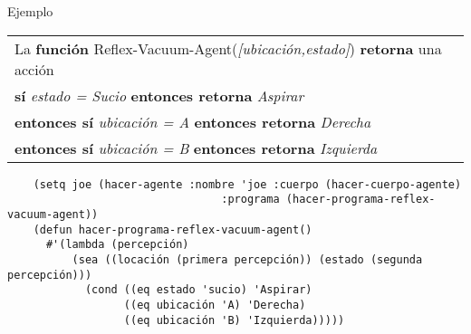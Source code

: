 \begin{frame}[fragile]{Ejemplo}
 \begin{center}
  \begin{tabular}{|l|} 
   \hline
   	La \textbf{función} Reflex-Vacuum-Agent(\textit{[ubicación,estado]}) \textbf{retorna} una acción \\
    \hspace{1em} \textbf{sí} \textit{estado = Sucio} \textbf{entonces retorna} \textit{Aspirar} \\
    \hspace{1em} \textbf{entonces sí} \textit{ubicación = A} \textbf{entonces retorna} \textit{Derecha} \\
    \hspace{1em} \textbf{entonces sí} \textit{ubicación = B} \textbf{entonces retorna} \textit{Izquierda} \\
   \hline
  \end{tabular}
  {\scriptsize 
	\begin{verbatim}
	(setq joe (hacer-agente :nombre 'joe :cuerpo (hacer-cuerpo-agente)
                                 :programa (hacer-programa-reflex-vacuum-agent))
    (defun hacer-programa-reflex-vacuum-agent()
      #'(lambda (percepción)
          (sea ((locación (primera percepción)) (estado (segunda percepción)))
            (cond ((eq estado 'sucio) 'Aspirar)
                  ((eq ubicación 'A) 'Derecha)
                  ((eq ubicación 'B) 'Izquierda)))))
  \end{verbatim}
  }
 \end{center}
\end{frame}